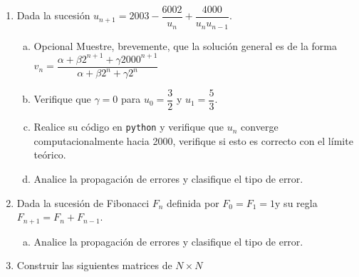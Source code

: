 \documentclass[
	spanish,
	9pt,
	utf8,
	xcolor=table,
	handout,
	aspectratio=1610,
	professionalfonts,
	notheorems,
	mathserif,
]{beamer}
\newcounter{savedenum}
\newcommand*{\resume}{\setcounter{enumi}{\thesavedenum}}
\begin{document}
\begin{frame}
	\begin{enumerate}
		\resume

		\item

		      Dada la sucesión
		      \begin{math}
			      u_{n+1}=
			      2003-
			      \dfrac{6002}{u_{n}}+
			      \dfrac{4000}{u_{n}u_{n-1}}
		      \end{math}.

		      \begin{enumerate}[a)]
			      \item

			            Opcional Muestre, brevemente, que la solución general es de la forma
			            \begin{math}
				            v_{n}=
				            \dfrac{
					            \alpha+
					            \beta 2^{n+1}+
					            \gamma 2000^{n+1}
				            }{
					            \alpha+
					            \beta 2^{n}+
					            \gamma 2^{n}}
			            \end{math}

			      \item

			            Verifique que $\gamma=0$ para $u_{0}=\dfrac{3}{2}$ y $u_{1}=\dfrac{5}{3}$.

			      \item

			            Realice su código en \texttt{python} y verifique que $u_{n}$ converge computacionalmente hacia 2000, verifique si esto es correcto con el límite teórico.

			      \item

			            Analice la propagación de errores y clasifique el tipo de error.
		      \end{enumerate}

		\item
		      Dada la sucesión de Fibonacci $F_{n}$ definida por $F_{0}=F_{1}=1 \mathrm{y}$ su regla $F_{n+1}=F_{n}+F_{n-1}$.

		      \begin{enumerate}[a)]
			      \item

			            Analice la propagación de errores y clasifique el tipo de error.
		      \end{enumerate}

		\item
		      Construir las siguientes matrices de $N\times N$


\end{enumerate}
\end{frame}
\end{document}
